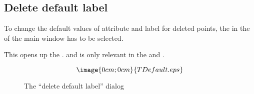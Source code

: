 \newpage
\subsection{Delete default label}%
\label{timestring.default}
To change the default values of attribute and label 
for deleted points, the  in
the  of the main window has to be selected.

This opens up the 
.
and is only relevant in the 
 and 
.


\begin{figure}[h]
$$\image{0cm;0cm}{TDefault.eps}$$%
\caption{The ``delete default label'' dialog}%
\label{timestring.default.dialog}
\end{figure}


